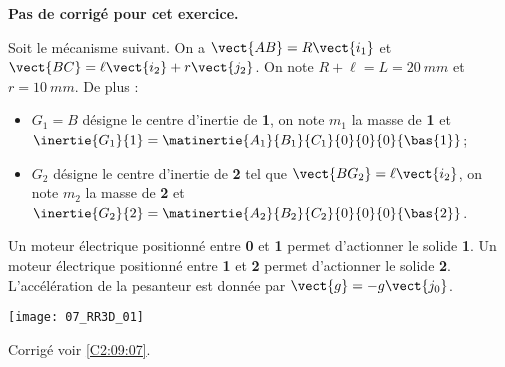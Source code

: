 \normalfalse \difficiletrue \tdifficilefalse
\correctionfalse


\setcounter{numques}{0}
\ifcorrection
\else
\textbf{Pas de corrigé pour cet exercice.}
\fi

\ifprof
\else
Soit le mécanisme suivant. On a $\vect{AB}=R\vect{i_1}$ et $\vect{BC}=\ell\vect{i_2}+r\vect{j_2}$. On note $R+\ell=L = \SI{20}{mm}$ et $r=\SI{10}{mm}$. De plus :
\begin{itemize}
\item $G_1=B$ désigne le centre d'inertie de \textbf{1}, on note $m_1$ la masse de \textbf{1} et $\inertie{G_1}{1}=\matinertie{A_1}{B_1}{C_1}{0}{0}{0}{\bas{1}}$; 
\item $G_2$ désigne le centre d'inertie de \textbf{2} tel que  $\vect{BG_2}=\ell\vect{i_2}$, on note $m_2$ la masse de \textbf{2} et $\inertie{G_2}{2}=\matinertie{A_2}{B_2}{C_2}{0}{0}{0}{\bas{2}}$.
\end{itemize}

Un moteur électrique positionné entre \textbf{0} et \textbf{1} permet d'actionner le solide \textbf{1}.
Un moteur électrique positionné entre \textbf{1} et \textbf{2} permet d'actionner le solide \textbf{2}.
L'accélération de la pesanteur est donnée par $\vect{g}=-g\vect{j_0}$.

\begin{center}
\texttt{[image: 07\_RR3D\_01]}
\end{center}
\fi

\ifprof
\else
\fi

\ifprof
\else
\begin{flushright}
\footnotesize{Corrigé  voir \ref{C2:09:07}.}
\end{flushright}%
\fi